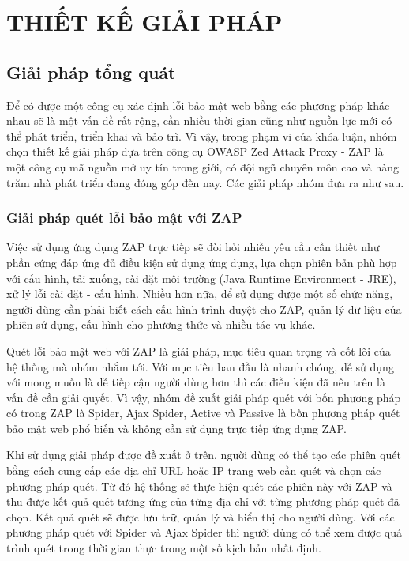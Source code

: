\chapter{THIẾT KẾ GIẢI PHÁP}

\section{Giải pháp tổng quát}

\tab Để có được một công cụ xác định lỗi bảo mật web bằng các phương pháp khác nhau sẽ là một vấn đề rất rộng, cần nhiều thời gian cũng như nguồn lực mới có thể phát triển, triển khai và bảo trì.
Vì vậy, trong phạm vi của khóa luận, nhóm chọn thiết kế giải pháp dựa trên công cụ OWASP Zed Attack Proxy - ZAP là một công cụ mã nguồn mở uy tín trong giới, có đội ngũ chuyên môn cao và hàng trăm nhà phát triển đang đóng góp đến nay.
Các giải pháp nhóm đưa ra như sau.

\subsection{Giải pháp quét lỗi bảo mật với ZAP}

\tab Việc sử dụng ứng dụng ZAP trực tiếp sẽ đòi hỏi nhiều yêu cầu cần thiết như phần cứng đáp ứng đủ điều kiện sử dụng ứng dụng, lựa chọn phiên bản phù hợp với cấu hình, tải xuống, cài đặt môi trường (Java Runtime Environment - JRE), xử lý lỗi cài đặt - cấu hình.
Nhiều hơn nữa, để sử dụng được một số chức năng, người dùng cần phải biết cách cấu hình trình duyệt cho ZAP, quản lý dữ liệu của phiên sử dụng, cấu hình cho phương thức và nhiều tác vụ khác.
\par

Quét lỗi bảo mật web với ZAP là giải pháp, mục tiêu quan trọng và cốt lõi của hệ thống mà nhóm nhắm tới.
Với mục tiêu ban đầu là nhanh chóng, dễ sử dụng với mong muốn là dễ tiếp cận người dùng hơn thì các điều kiện đã nêu trên là vấn đề cần giải quyết.
Vì vậy, nhóm đề xuất giải pháp quét với bốn phương pháp có trong ZAP là Spider, Ajax Spider, Active và Passive là bốn phương pháp quét bảo mật web phổ biến và không cần sử dụng trực tiếp ứng dụng ZAP.
\par

Khi sử dụng giải pháp được đề xuất ở trên, người dùng có thể tạo các phiên quét bằng cách cung cấp các địa chỉ URL hoặc IP trang web cần quét và chọn các phương pháp quét.
Từ đó hệ thống sẽ thực hiện quét các phiên này với ZAP và thu được kết quả quét tương ứng của từng địa chỉ với từng phương pháp quét đã chọn.
Kết quả quét sẽ được lưu trữ, quản lý và hiển thị cho người dùng.
Với các phương pháp quét với Spider và Ajax Spider thì người dùng có thể xem được quá trình quét trong thời gian thực trong một số kịch bản nhất định.


